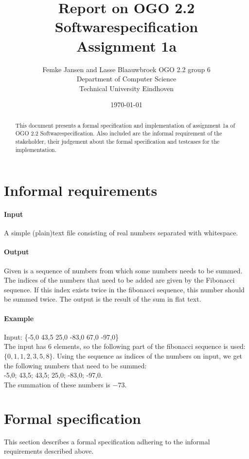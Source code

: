 \documentclass[12pt]{article}
\title{Report on OGO 2.2 Softwarespecification\\ Assignment 1a}
\author{
        Femke Jansen and Lasse Blaauwbroek OGO 2.2 group 6 \\
                Department of Computer Science\\
        Technical University Eindhoven\\
}
\date{\today}
\begin{document}
\maketitle

\begin{abstract}
This document presents a formal specification and implementation of assignment 1a of OGO 2.2 Softwarespecification. Also included are the informal requirement of the stakeholder, their judgement about the formal specification and testcases for the implementation.
\end{abstract}

\section{Informal requirements}
\paragraph{Input} A simple (plain)text file consisting of real numbers separated with whitespace.
\paragraph{Output} Given is a sequence of numbers from which some numbers needs to be summed. The indices of the numbers that need to be added are given by the Fibonacci sequence. If this index exists twice in the fibonacci sequence, this number should be summed twice. The output is the result of the sum in flat text.
\paragraph{Example}
Input: \{-5,0 43,5 25,0 -83,0 67,0 -97,0\}\\
The input has $6$ elements, so the following part of the fibonacci sequence is used: $\{0, 1, 1, 2, 3, 5, 8\}$. Using the sequence as indices of the numbers on input, we get the following numbers that need to be summed: \\ {-5,0; 43,5; 43,5; 25,0; -83,0; -97,0}. \\ The summation of these numbers is $-73$.

\section{Formal specification}

This section describes a formal specification adhering to the informal requirements described above.
\end{document}
